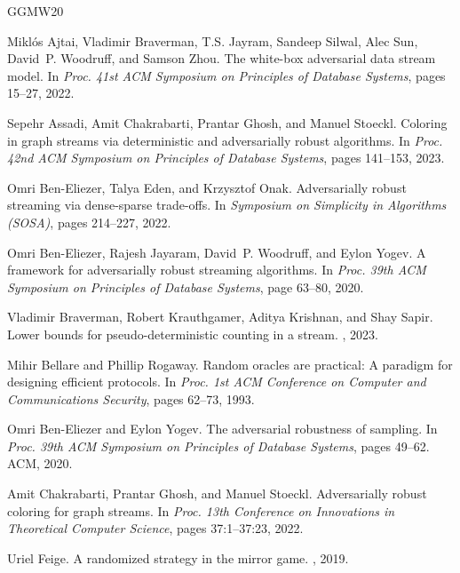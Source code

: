 \documentclass[10pt,a4paper]{article}
\theoremstyle{definition}
\theoremstyle{remark}
\begin{document}
\begin{itemize}
\begin{itemize}
\newcommand{\etalchar}[1]{$^{#1}$}
\begin{thebibliography}{GGMW20}

\bibitem[ABJ{\etalchar{+}}22]{AjtaiBJSSWZ22}
Mikl\'os Ajtai, Vladimir Braverman, T.S. Jayram, Sandeep Silwal, Alec Sun,
  David~P. Woodruff, and Samson Zhou.
\newblock The white-box adversarial data stream model.
\newblock In {\em Proc. 41st ACM Symposium on Principles of Database Systems},
  pages 15--27, 2022.

Sepehr Assadi, Amit Chakrabarti, Prantar Ghosh, and Manuel Stoeckl.
\newblock Coloring in graph streams via deterministic and adversarially robust
  algorithms.
\newblock In {\em Proc. 42nd ACM Symposium on Principles of Database Systems},
  pages 141--153, 2023.

Omri Ben-Eliezer, Talya Eden, and Krzysztof Onak.
\newblock Adversarially robust streaming via dense-sparse trade-offs.
\newblock In {\em Symposium on Simplicity in Algorithms (SOSA)}, pages
  214--227, 2022.

Omri Ben{-}Eliezer, Rajesh Jayaram, David~P. Woodruff, and Eylon Yogev.
\newblock A framework for adversarially robust streaming algorithms.
\newblock In {\em Proc. 39th ACM Symposium on Principles of Database Systems},
  page 63–80, 2020.

Vladimir Braverman, Robert Krauthgamer, Aditya Krishnan, and Shay Sapir.
\newblock Lower bounds for pseudo-deterministic counting in a stream.
, 2023.

Mihir Bellare and Phillip Rogaway.
\newblock Random oracles are practical: A paradigm for designing efficient
  protocols.
\newblock In {\em Proc. 1st ACM Conference on Computer and Communications
  Security}, pages 62--73, 1993.

Omri Ben{-}Eliezer and Eylon Yogev.
\newblock The adversarial robustness of sampling.
\newblock In {\em Proc. 39th ACM Symposium on Principles of Database Systems},
  pages 49--62. {ACM}, 2020.

Amit Chakrabarti, Prantar Ghosh, and Manuel Stoeckl.
\newblock Adversarially robust coloring for graph streams.
\newblock In {\em Proc. 13th Conference on Innovations in Theoretical Computer
  Science}, pages 37:1--37:23, 2022.

Uriel Feige.
\newblock A randomized strategy in the mirror game.
, 2019.


\end{thebibliography}
\end{itemize}
\end{itemize}
\end{document}
